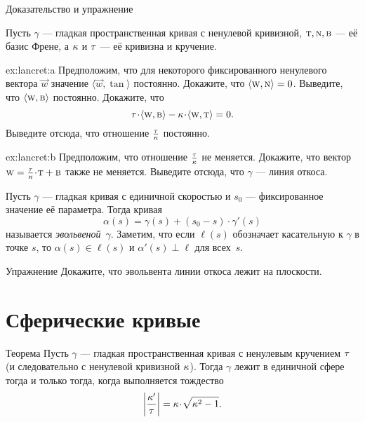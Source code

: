 \begin{thm}{Доказательство и упражнение}\label{ex:lancret}
{\sloppy
Пусть $\gamma$ --- гладкая пространственная кривая с ненулевой кривизной, $\text{\sc{t}},\text{\sc{n}},\text{\sc{b}}$ --- её базис Френе, а $\kappa$ и $\tau$ --- её кривизна и кручение.

}

\begin{subthm}{ex:lancret:a}
Предположим, что для некоторого фиксированного ненулевого вектора $\vec w$ значение $\langle \vec w,\tan\rangle$ постоянно.
Докажите, что $\langle \vec w, \norm\rangle \z=0$.
Выведите, что $\langle \text{\sc{w}},\text{\sc{b}}\rangle$ постоянно.
Докажите, что \[\tor\cdot\langle \vec w,\bi\rangle -\kur\cdot\langle \vec w,\tan\rangle =0.\]
Выведите отсюда, что отношение $\tfrac{\tau}{\kappa}$ постоянно.
\end{subthm}

{\sloppy

\begin{subthm}{ex:lancret:b}
Предположим, что отношение $\tfrac{\tau}{\kappa}$ не меняется.
Докажите, что вектор $\vec w\z=\tfrac\tor\kur\cdot \tan+\bi$ также не меняется.
Выведите отсюда, что $\gamma$ --- линия откоса.
\end{subthm}

}

\end{thm}

Пусть $\gamma$ --- гладкая кривая с единичной скоростью и $s_0$ --- фиксированное значение её параметра. 
Тогда кривая 
\[\alpha(s)=\gamma(s)+(s_0-s)\cdot \gamma'(s)\]
называется \emph{эвольвеной}~$\gamma$.
Заметим, что если $\ell(s)$ обозначает касательную к $\gamma$ в точке $s$,
то $\alpha(s)\in \ell(s)$ и $\alpha'(s)\perp \ell$ для всех~$s$.

\begin{thm}{Упражнение}\label{ex:evolvent-constant-slope}
Докажите, что эвольвента линии откоса лежит на плоскости.
\end{thm}

\section{Сферические кривые}

\begin{thm}{Теорема}
Пусть $\gamma$ --- гладкая пространственная кривая с ненулевым кручением $\tau$ (и следовательно с ненулевой кривизной $\kappa$).
Тогда $\gamma$ лежит в единичной сфере тогда и только тогда, когда выполняется тождество
\[\left|\frac{\kur'}{\tor}\right|=\kur\cdot\sqrt{\kur^2-1}.\]
\end{thm}

